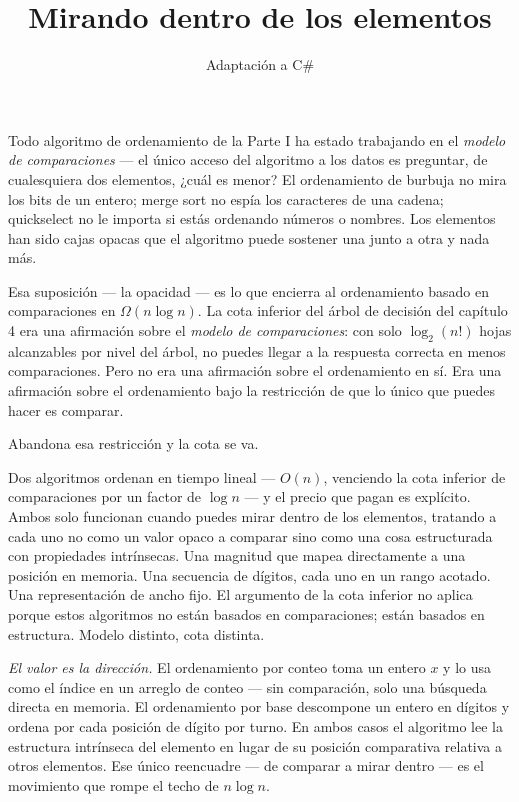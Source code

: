 \documentclass[11pt,a4paper]{article}
\title{Mirando dentro de los elementos}
\author{Adaptación a C\#}
\date{}
\begin{document}
\maketitle

Todo algoritmo de ordenamiento de la Parte I ha estado trabajando en el \emph{modelo de comparaciones} --- el único acceso del algoritmo a los datos es preguntar, de cualesquiera dos elementos, ¿cuál es menor? El ordenamiento de burbuja no mira los bits de un entero; merge sort no espía los caracteres de una cadena; quickselect no le importa si estás ordenando números o nombres. Los elementos han sido cajas opacas que el algoritmo puede sostener una junto a otra y nada más.

Esa suposición --- la opacidad --- es lo que encierra al ordenamiento basado en comparaciones en $\Omega(n \log n)$. La cota inferior del árbol de decisión del capítulo 4 era una afirmación sobre el \emph{modelo de comparaciones}: con solo $\log_2(n!)$ hojas alcanzables por nivel del árbol, no puedes llegar a la respuesta correcta en menos comparaciones. Pero no era una afirmación sobre el ordenamiento en sí. Era una afirmación sobre el ordenamiento bajo la restricción de que lo único que puedes hacer es comparar.

Abandona esa restricción y la cota se va.

Dos algoritmos ordenan en tiempo lineal --- $O(n)$, venciendo la cota inferior de comparaciones por un factor de $\log n$ --- y el precio que pagan es explícito. Ambos solo funcionan cuando puedes mirar dentro de los elementos, tratando a cada uno no como un valor opaco a comparar sino como una cosa estructurada con propiedades intrínsecas. Una magnitud que mapea directamente a una posición en memoria. Una secuencia de dígitos, cada uno en un rango acotado. Una representación de ancho fijo. El argumento de la cota inferior no aplica porque estos algoritmos no están basados en comparaciones; están basados en estructura. Modelo distinto, cota distinta.

\emph{El valor es la dirección.} El ordenamiento por conteo toma un entero $x$ y lo usa como el índice en un arreglo de conteo --- sin comparación, solo una búsqueda directa en memoria. El ordenamiento por base descompone un entero en dígitos y ordena por cada posición de dígito por turno. En ambos casos el algoritmo lee la estructura intrínseca del elemento en lugar de su posición comparativa relativa a otros elementos. Ese único reencuadre --- de comparar a mirar dentro --- es el movimiento que rompe el techo de $n \log n$.
\end{document}
